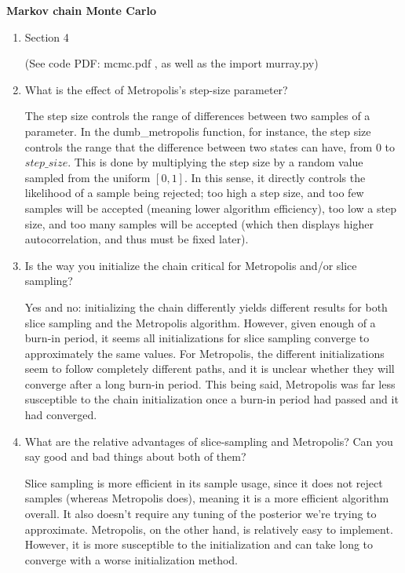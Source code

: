 \documentclass[11pt]{article}
\begin{document}
\vspace{10mm}
\textbf{Markov chain Monte Carlo}


\begin{enumerate}
    \item Section 4

        (See code PDF: mcmc.pdf , as well as the import murray.py)

    \item What is the effect of Metropolis’s step-size parameter?

        The step size controls the range of differences between two samples of a parameter. In the dumb\_metropolis function, for instance, the step size controls the range that the difference between two states can have, from $0$ to $step\_size$. This is done by multiplying the step size by a random value sampled from the uniform $[0, 1]$. In this sense, it directly controls the likelihood of a sample being rejected; too high a step size, and too few samples will be accepted (meaning lower algorithm efficiency), too low a step size, and too many samples will be accepted (which then displays higher autocorrelation, and thus must be fixed later).
    
    \item Is the way you initialize the chain critical for Metropolis and/or slice sampling?

        Yes and no: initializing the chain differently yields different results for both slice sampling and the Metropolis algorithm. However, given enough of a burn-in period, it seems all initializations for slice sampling converge to approximately the same values. For Metropolis, the different initializations seem to follow completely different paths, and it is unclear whether they will converge after a long burn-in period. This being said, Metropolis was far less susceptible to the chain initialization once a burn-in period had passed and it had converged.
    
    \item What are the relative advantages of slice-sampling and Metropolis? Can you say good and bad things about both of them?

        Slice sampling is more efficient in its sample usage, since it does not reject samples (whereas Metropolis does), meaning it is a more efficient algorithm overall. It also doesn't require any tuning of the posterior we're trying to approximate. Metropolis, on the other hand, is relatively easy to implement. However, it is more susceptible to the initialization and can take long to converge with a worse initialization method.


\end{enumerate}
\end{document}
